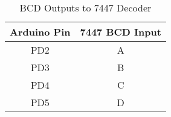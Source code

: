 \begin{table}[h]
    \centering
    \begin{tabular}{|c|c|}
        \hline
        \textbf{Arduino Pin} & \textbf{7447 BCD Input} \\
        \hline
        PD2 & A \\
        PD3 & B \\
        PD4 & C \\
        PD5 & D \\
        \hline
    \end{tabular}
    \caption{BCD Outputs to 7447 Decoder}
    \label{tab:7447}
\end{table}

